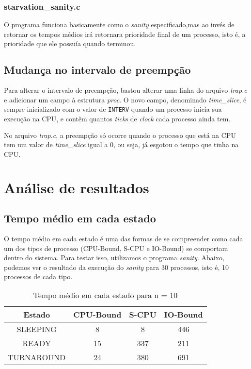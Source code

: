 \documentclass{article}
\begin{document}
\subsubsection{starvation_sanity.c}

O programa funciona basicamente como o \textit{sanity} especificado,mas ao
invés de retornar os tempos médios irá retornara prioridade final de um
processo, isto é, a prioridade que ele possuía quando terminou.

\subsection{Mudança no intervalo de preempção}

Para alterar o intervalo de preempção, bastou alterar uma linha do arquivo
\textit{trap.c} e adicionar um campo à estrutura \textit{proc}. O novo campo,
denominado \textit{time\_slice}, é sempre inicializado com o valor de
\texttt{INTERV} quando um processo inicia sua execução na CPU, e contêm quantos
\textit{ticks} de \textit{clock} cada processo ainda tem.

No arquivo \textit{trap.c}, a preempção só ocorre quando o processo que está na
CPU tem um valor de \textit{time\_slice} igual a 0, ou seja, já esgotou o tempo
que tinha na CPU.

\section{Análise de resultados}

\subsection{Tempo médio em cada estado}

O tempo médio em cada estado é uma das formas de se compreender como cada um
dos tipos de processo (CPU-Bound, S-CPU e IO-Bound) se comportam dentro do
sistema. Para testar isso, utilizamos o programa \textit{sanity}. Abaixo,
podemos ver o resultado da execução do \textit{sanity} para 30 processos, isto
é, 10 processos de cada tipo.

\begin{table}[H]
      \centering
      \begin{tabular}{|c|c|c|c|}
            \hline
            Estado     & CPU-Bound & S-CPU & IO-Bound
            \\
            \hline
            SLEEPING   & 8         & 8     & 446      \\
            READY      & 15        & 337   & 211      \\
            TURNAROUND & 24        & 380   & 691      \\
            \hline
      \end{tabular}
      \caption{Tempo médio em cada estado para n = 10}
\end{table}
\end{document}
